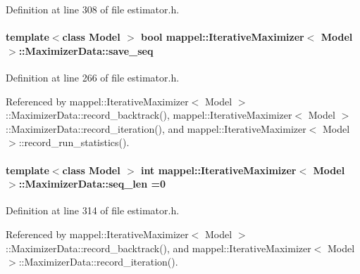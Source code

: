 Definition at line 308 of file estimator.\+h.

\paragraph[{\texorpdfstring{save\+\_\+seq}{save_seq}}]{\setlength{\rightskip}{0pt plus 5cm}template$<$class Model $>$ bool {\bf mappel\+::\+Iterative\+Maximizer}$<$ Model $>$\+::Maximizer\+Data\+::save\+\_\+seq}\hypertarget{classmappel_1_1IterativeMaximizer_1_1MaximizerData_af13babebeb16147883db7af0b4875b53}{}\label{classmappel_1_1IterativeMaximizer_1_1MaximizerData_af13babebeb16147883db7af0b4875b53}


Definition at line 266 of file estimator.\+h.



Referenced by mappel\+::\+Iterative\+Maximizer$<$ Model $>$\+::\+Maximizer\+Data\+::record\+\_\+backtrack(), mappel\+::\+Iterative\+Maximizer$<$ Model $>$\+::\+Maximizer\+Data\+::record\+\_\+iteration(), and mappel\+::\+Iterative\+Maximizer$<$ Model $>$\+::record\+\_\+run\+\_\+statistics().

\paragraph[{\texorpdfstring{seq\+\_\+len}{seq_len}}]{\setlength{\rightskip}{0pt plus 5cm}template$<$class Model $>$ int {\bf mappel\+::\+Iterative\+Maximizer}$<$ Model $>$\+::Maximizer\+Data\+::seq\+\_\+len =0\hspace{0.3cm}{\ttfamily [protected]}}\hypertarget{classmappel_1_1IterativeMaximizer_1_1MaximizerData_a78a56d5ffe0cad0de474e244816748a6}{}\label{classmappel_1_1IterativeMaximizer_1_1MaximizerData_a78a56d5ffe0cad0de474e244816748a6}


Definition at line 314 of file estimator.\+h.



Referenced by mappel\+::\+Iterative\+Maximizer$<$ Model $>$\+::\+Maximizer\+Data\+::record\+\_\+backtrack(), and mappel\+::\+Iterative\+Maximizer$<$ Model $>$\+::\+Maximizer\+Data\+::record\+\_\+iteration().

